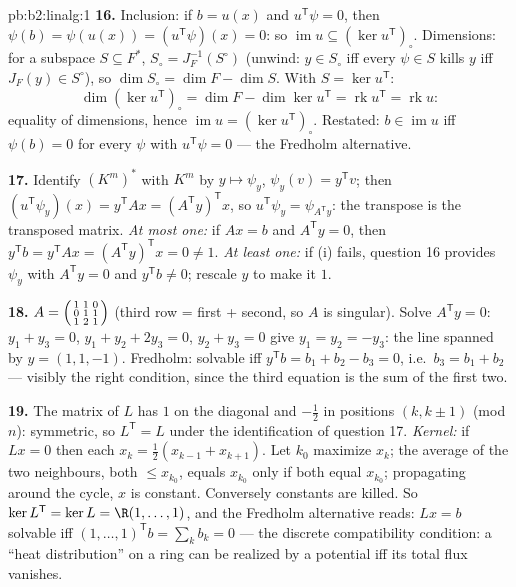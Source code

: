 \begin{solution}{pb:b2:linalg:1}
\textbf{16.} Inclusion: if $b = u(x)$ and $u^{\mathsf T}\psi =
0$, then $\psi(b) = \psi(u(x)) = (u^{\mathsf T}\psi)(x) = 0$: so
$\operatorname{im} u \subseteq (\ker u^{\mathsf T})_\circ$.
Dimensions: for a subspace $S \subseteq F^*$, $S_\circ =
J_F^{-1}(S^\circ)$ (unwind: $y \in S_\circ$ iff every $\psi \in
S$ kills $y$ iff $J_F(y) \in S^\circ$), so $\dim S_\circ = \dim
F - \dim S$. With $S = \ker u^{\mathsf T}$:
\[
\dim(\ker u^{\mathsf T})_\circ
= \dim F - \dim\ker u^{\mathsf T}
= \operatorname{rk} u^{\mathsf T} = \operatorname{rk} u :
\]
equality of dimensions, hence $\operatorname{im} u = (\ker
u^{\mathsf T})_\circ$. Restated: $b \in \operatorname{im} u$ iff
$\psi(b) = 0$ for every $\psi$ with $u^{\mathsf T}\psi = 0$ ---
the Fredholm alternative.

\textbf{17.} Identify $(K^m)^*$ with $K^m$ by $y \mapsto \psi_y$,
$\psi_y(v) = y^{\mathsf T}v$; then $(u^{\mathsf T}\psi_y)(x) =
y^{\mathsf T}Ax = (A^{\mathsf T}y)^{\mathsf T}x$, so $u^{\mathsf
T}\psi_y = \psi_{A^{\mathsf T}y}$: the transpose is the
transposed matrix. \emph{At most one:} if $Ax = b$ and
$A^{\mathsf T}y = 0$, then $y^{\mathsf T}b = y^{\mathsf T}Ax =
(A^{\mathsf T}y)^{\mathsf T}x = 0 \neq 1$. \emph{At least one:}
if (i) fails, question 16 provides $\psi_y$ with $A^{\mathsf T}y
= 0$ and $y^{\mathsf T}b \neq 0$; rescale $y$ to make it $1$.

\textbf{18.} $A = \begin{psmallmatrix} 1 & 1 & 0\\ 0 & 1 & 1\\
1 & 2 & 1\end{psmallmatrix}$ (third row = first + second, so $A$
is singular). Solve $A^{\mathsf T}y = 0$: $y_1 + y_3 = 0$, $y_1
+ y_2 + 2y_3 = 0$, $y_2 + y_3 = 0$ give $y_1 = y_2 = -y_3$: the
line spanned by $y = (1, 1, -1)$. Fredholm: solvable iff
$y^{\mathsf T}b = b_1 + b_2 - b_3 = 0$, i.e.\ $b_3 = b_1 + b_2$
--- visibly the right condition, since the third equation is the
sum of the first two.

\textbf{19.} The matrix of $L$ has $1$ on the diagonal and
$-\frac12$ in positions $(k, k\pm1)$ (mod $n$): symmetric, so
$L^{\mathsf T} = L$ under the identification of question 17.
\emph{Kernel:} if $Lx = 0$ then each $x_k = \frac12(x_{k-1} +
x_{k+1})$. Let $k_0$ maximize $x_k$; the average of the two
neighbours, both $\leq x_{k_0}$, equals $x_{k_0}$ only if both
equal $x_{k_0}$; propagating around the cycle, $x$ is constant.
Conversely constants are killed. So $\ker L^{\mathsf T} = \ker L
= \R(1, \dots, 1)$, and the Fredholm alternative reads: $Lx = b$
solvable iff $(1,\dots,1)^{\mathsf T} b = \sum_k b_k = 0$ ---
the discrete compatibility condition: a ``heat distribution'' on
a ring can be realized by a potential iff its total flux
vanishes.


\end{solution}
